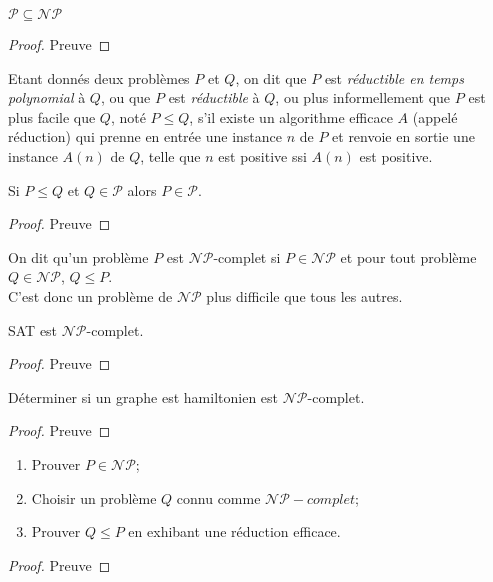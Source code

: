 \begin{mycorr}
  $\mathcal{P} \subseteq \mathcal{NP}$
  \begin{proof}
     Preuve \addTODO
  \end{proof}
\end{mycorr}

\begin{mydef}
  Etant donnés deux problèmes $P$ et $Q$, on dit que $P$ est \emph{réductible en temps polynomial} à $Q$, ou que $P$ est \emph{réductible} à $Q$, ou plus informellement que $P$ est plus facile que $Q$, noté $P \leq Q$, s’il existe un algorithme efficace $A$ (appelé réduction) qui prenne en entrée une instance $n$ de $P$ et renvoie en sortie une instance $A(n)$ de $Q$, telle que $n$ est positive ssi $A(n)$ est positive.
\end{mydef}

\begin{mytheo}
  Si $P \leq Q$ et $Q \in \mathcal{P}$ alors $P \in \mathcal{P}$.
  \begin{proof}
     Preuve \addTODO
  \end{proof}
\end{mytheo}

\begin{mydef}
  On dit qu'un problème $P$ est $\mathcal{NP}$-complet si $P \in \mathcal{NP}$ et pour tout problème $Q \in \mathcal{NP}$, $Q \leq P$.\\
  C'est donc un problème de $\mathcal{NP}$ plus difficile que tous les autres.
\end{mydef}

\begin{mytheo} [Cook]
  SAT est $\mathcal{NP}$-complet.
  \begin{proof}
     Preuve \addTODO
  \end{proof}
\end{mytheo}

\begin{mytheo} [Karp]
  Déterminer si un graphe est hamiltonien est $\mathcal{NP}$-complet.
  \begin{proof}
     Preuve \addTODO
  \end{proof}
\end{mytheo}

\begin{mytheo} 
  \begin{enumerate}
    \item Prouver $P \in \mathcal{NP}$;
    \item Choisir un problème $Q$ connu comme $\mathcal{NP}-complet$;
    \item Prouver $Q \leq P$ en exhibant une réduction efficace.
  \end{enumerate}
  \begin{proof}
     Preuve \addTODO
  \end{proof}
\end{mytheo}

